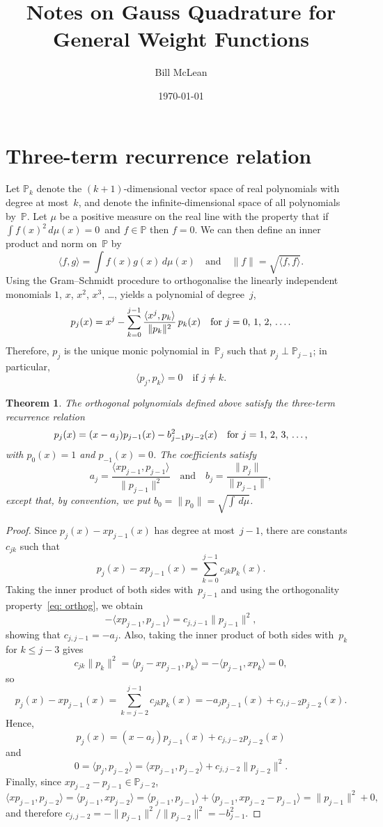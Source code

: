 \documentclass[12pt,a4paper]{article}
\title{Notes on Gauss Quadrature for General Weight Functions}
\author{Bill McLean}
\date{\today}
\newtheorem{theorem}{Theorem}
\newcommand{\iprod}[1]{\langle#1\rangle}
\newcommand{\Poly}{\mathbb{P}}
\begin{document}
\maketitle
\tableofcontents
\section{Three-term recurrence relation}
Let $\Poly_k$ denote the $(k+1)$-dimensional vector space of real 
polynomials with degree at most~$k$, and denote the 
infinite-dimensional space of all polynomials by~$\Poly$.  Let $\mu$ 
be a positive measure on the real line with the property that if
$\int f(x)^2\,d\mu(x)=0$~and $f\in\Poly$ then $f=0$.
We can then define an inner product and norm on~$\Poly$  by
\[
\iprod{f,g}=\int f(x)g(x)\,d\mu(x)\quad\text{and}\quad
\|f\|=\sqrt{\iprod{f,f}}.
\]
Using the Gram--Schmidt procedure to orthogonalise the linearly 
independent monomials $1$, $x$, $x^2$, $x^3$, \dots, yields a
polynomial of degree~$j$,  
\[
p_j(x)=x^j-\sum_{k=0}^{j-1}\frac{\iprod{x^j,p_k}}{\|p_k\|^2}\,p_k(x)
	\quad\text{for $j=0$, $1$, $2$, \dots.}
\]
Therefore, $p_j$ is the unique monic polynomial in~$\Poly_j$ such 
that $p_j\perp\Poly_{j-1}$; in particular,
\begin{equation}\label{eq: orthog}
\iprod{p_j,p_k}=0\quad\text{if $j\ne k$.}
\end{equation}

\begin{theorem}\label{thm: 3 term}
The orthogonal polynomials defined above satisfy the three-term 
recurrence relation
\begin{equation}\label{eq: 3 term pj}
p_j(x)=(x-a_j)p_{j-1}(x)-b_{j-1}^2p_{j-2}(x)
	\quad\text{for $j=1$, $2$, $3$, \dots,}
\end{equation}
with $p_0(x)=1$ and $p_{-1}(x)=0$. The coefficients satisfy
\[
a_j=\frac{\iprod{xp_{j-1},p_{j-1}}}{\|p_{j-1}\|^2}
\quad\text{and}\quad
b_j=\frac{\|p_j\|}{\|p_{j-1}\|},
\]
except that, by convention, we put $b_0=\|p_0\|=\sqrt{\int\,d\mu}$.
\end{theorem}
\begin{proof}
Since $p_j(x)-xp_{j-1}(x)$ has degree at most~$j-1$, there are 
constants~$c_{jk}$ such that
\[
p_j(x)-xp_{j-1}(x)=\sum_{k=0}^{j-1}c_{jk}p_k(x).
\]
Taking the inner product of both sides with~$p_{j-1}$ and using
the orthogonality property~\eqref{eq: orthog}, we obtain
\[
-\iprod{xp_{j-1},p_{j-1}}=c_{j,j-1}\|p_{j-1}\|^2,
\]
showing that $c_{j,j-1}=-a_j$.  Also, taking the inner product of both
sides with~$p_k$ for $k\le j-3$ gives
\[
c_{jk}\|p_k\|^2=\iprod{p_j-xp_{j-1},p_k}=-\iprod{p_{j-1},xp_k}=0,
\]
so 
\[
p_j(x)-xp_{j-1}(x)=\sum_{k=j-2}^{j-1}c_{jk}p_k(x)
	=-a_jp_{j-1}(x)+c_{j,j-2}p_{j-2}(x).
\]
Hence,
\[
p_j(x)=(x-a_j)p_{j-1}(x)+c_{j,j-2}p_{j-2}(x)
\]
and
\[
0=\iprod{p_j,p_{j-2}}=\iprod{xp_{j-1},p_{j-2}}+c_{j,j-2}\|p_{j-2}\|^2.
\]
Finally, since $xp_{j-2}-p_{j-1}\in\Poly_{j-2}$,
\[
\iprod{xp_{j-1},p_{j-2}}=\iprod{p_{j-1},xp_{j-2}}
	=\iprod{p_{j-1},p_{j-1}}+\iprod{p_{j-1},xp_{j-2}-p_{j-1}}
	=\|p_{j-1}\|^2+0,
\]
and therefore $c_{j,j-2}=-\|p_{j-1}\|^2/\|p_{j-2}\|^2=-b_{j-1}^2$.
\end{proof}
\end{document}
